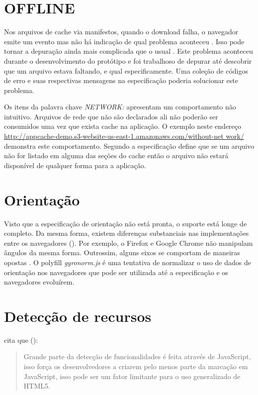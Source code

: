 \section{OFFLINE}

Nos arquivos de cache via manifestos, quando o download falha, o
navegador emite um evento mas não há indicação de qual problema
aconteceu . Isso pode tornar a
depuração ainda mais complicada que o usual \autocite{diveIntohtml}.
Este problema aconteceu durante o desenvolvimento do protótipo e foi
trabalhoso de depurar até descobrir que um arquivo estava faltando,
e qual especificamente. Uma coleção de códigos de erro e suas
respectivas mensagens na especificação poderia solucionar este
problema.

Os itens da palavra chave \textit{NETWORK:} apresentam um
comportamento não intuitivo. Arquivos de rede que não
são declarados ali não poderão ser consumidos uma vez
que exista cache na aplicação. O exemplo neste endereço
\url{http://appcache-demo.s3-website-us-east-1.amazonaws.com/without-net
work/} demonstra este comportamento. Segundo \citet{gameAssetManagement}
a especificação define que se um arquivo não for listado em alguma
das seções do cache então o arquivo não estará disponível de
qualquer forma para a aplicação.

\section{Orientação}

Visto que a especificação de orientação não está pronta,
o suporte está longe de completo. Da mesma forma, existem
diferenças substanciais nas implementações entre os navegadores
(). Por exemplo, o Firefox e Google
Chrome não manipulam ângulos da mesma forma. Outrossim, alguns
eixos se comportam de maneiras opostas \autocite{mdnOrientation}. O
polyfill \textit{gyronorm.js} é uma tentativa de normalizar o uso de
dados de orientação nos navegadores que pode ser utilizada até a
especificação e os navegadores evoluírem.

\section{Detecção de recursos}

\citet{diveIntohtml} cita que ():
\begin{quote}
Grande parte da detecção de funcionalidades é feita através de
JavaScript, isso força os desenvolvedores a criarem pelo menos parte da
marcação em JavaScript, isso pode ser um fator limitante para o uso
generalizado de HTML5.
\end{quote}

